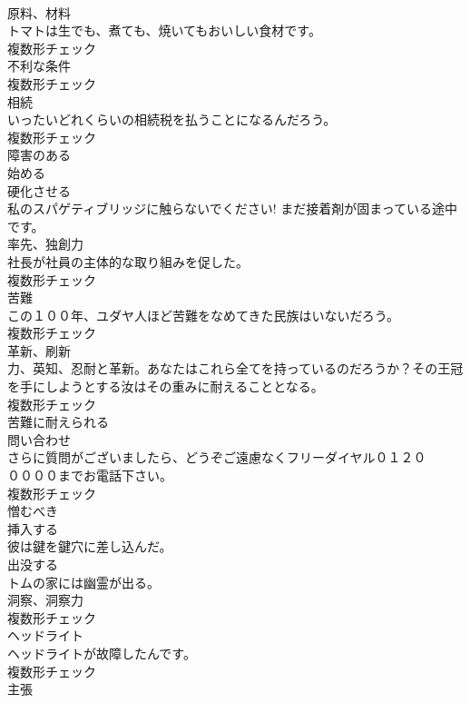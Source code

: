\documentclass[8pt]{extreport}
\begin{document}
\begin{CJK}{UTF8}{min}
\\	[名詞]	原料、材料	
\\	トマトは生でも、煮ても、焼いてもおいしい食材です。	
\\	複数形チェック
\\	[名詞]	不利な条件	
\\	複数形チェック
\\	[名詞]	相続	
\\	いったいどれくらいの相続税を払うことになるんだろう。	
\\	複数形チェック
\\	[形容詞]	障害のある	
\\	[動詞]	始める	
\\	[動詞]	硬化させる	
\\	私のスパゲティブリッジに触らないでください! まだ接着剤が固まっている途中です。	
\\	[名詞]	率先、独創力	
\\	社長が社員の主体的な取り組みを促した。	
\\	複数形チェック
\\	[名詞]	苦難	
\\	この１００年、ユダヤ人ほど苦難をなめてきた民族はいないだろう。	
\\	複数形チェック
\\	[名詞]	革新、刷新	
\\	力、英知、忍耐と革新。あなたはこれら全てを持っているのだろうか？その王冠を手にしようとする汝はその重みに耐えることとなる。	
\\	複数形チェック
\\	[形容詞]	苦難に耐えられる	
\\	[名詞]	問い合わせ	
\\	さらに質問がございましたら、どうぞご遠慮なくフリーダイヤル０１２０
\\	００００までお電話下さい。	
\\	複数形チェック
\\	[形容詞]	憎むべき	
\\	[動詞]	挿入する	
\\	彼は鍵を鍵穴に差し込んだ。	
\\	[動詞]	出没する	
\\	トムの家には幽霊が出る。	
\\	[名詞]	洞察、洞察力	
\\	複数形チェック
\\	[名詞]	ヘッドライト	
\\	ヘッドライトが故障したんです。	
\\	複数形チェック
\\	[名詞]	主張	

\end{CJK}
\end{document}
